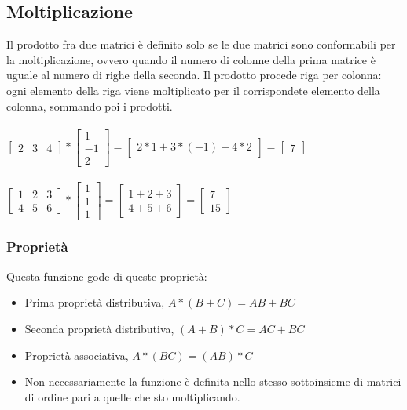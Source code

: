 \documentclass[a4paper]{article}
\begin{document}
\subsection{Moltiplicazione}
Il prodotto fra due matrici è definito solo se le due matrici sono conformabili per la moltiplicazione, ovvero quando il numero di colonne della prima matrice è uguale al numero di righe della seconda. Il prodotto procede riga per colonna: ogni elemento della riga viene moltiplicato per il corrispondete elemento della colonna, sommando poi i prodotti.
\\
\\
$ \left[\begin{matrix} 2 & 3 & 4\end{matrix}\right] * \left[\begin{matrix}1 \\ -1 \\ 2 \end{matrix}\right] = \left[\begin{matrix}2*1 + 3*(-1) + 4*2 \end{matrix}\right]= \left[\begin{matrix}7\end{matrix}\right]
$
\\
\\
$\left[\begin{matrix} 1 & 2 & 3 \\ 4 & 5 & 6\end{matrix}\right] * \left[\begin{matrix}1 \\ 1 \\ 1 \end{matrix}\right] = \left[\begin{matrix} 1 + 2 + 3\\ 4 + 5 + 6 \end{matrix}\right]= \left[\begin{matrix}7 \\ 15 \end{matrix}\right]
$
\subsubsection{Proprietà}
Questa funzione gode di queste proprietà:
\begin{itemize}
\item Prima proprietà distributiva, $A*(B + C) = AB + BC$
\item Seconda proprietà distributiva, $(A + B)*C = AC +BC$
\item Proprietà associativa, $A*(BC) = (AB)*C$
\item Non necessariamente la funzione è definita nello stesso sottoinsieme di matrici di ordine pari a quelle che sto moltiplicando.
\end{itemize}
\end{document}
